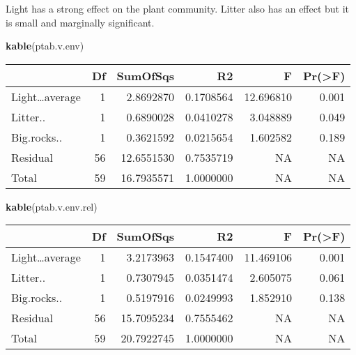 \documentclass[]{article}
\newenvironment{Shaded}{\begin{snugshade}}{\end{snugshade}}
\newcommand{\KeywordTok}[1]{\textcolor[rgb]{0.13,0.29,0.53}{\textbf{#1}}}
\newcommand{\NormalTok}[1]{#1}
\begin{document}
Light has a strong effect on the plant community. Litter also has an
effect but it is small and marginally significant.

\begin{Shaded}
\begin{Highlighting}[]
\KeywordTok{kable}\NormalTok{(ptab.v.env)}
\end{Highlighting}
\end{Shaded}

\begin{longtable}[]{@{}lrrrrr@{}}
\toprule
& Df & SumOfSqs & R2 & F & Pr(\textgreater{}F)\tabularnewline
\midrule
\endhead
Light\ldots{}average & 1 & 2.8692870 & 0.1708564 & 12.696810 &
0.001\tabularnewline
Litter.. & 1 & 0.6890028 & 0.0410278 & 3.048889 & 0.049\tabularnewline
Big.rocks.. & 1 & 0.3621592 & 0.0215654 & 1.602582 &
0.189\tabularnewline
Residual & 56 & 12.6551530 & 0.7535719 & NA & NA\tabularnewline
Total & 59 & 16.7935571 & 1.0000000 & NA & NA\tabularnewline
\bottomrule
\end{longtable}

\begin{Shaded}
\begin{Highlighting}[]
\KeywordTok{kable}\NormalTok{(ptab.v.env.rel)}
\end{Highlighting}
\end{Shaded}

\begin{longtable}[]{@{}lrrrrr@{}}
\toprule
& Df & SumOfSqs & R2 & F & Pr(\textgreater{}F)\tabularnewline
\midrule
\endhead
Light\ldots{}average & 1 & 3.2173963 & 0.1547400 & 11.469106 &
0.001\tabularnewline
Litter.. & 1 & 0.7307945 & 0.0351474 & 2.605075 & 0.061\tabularnewline
Big.rocks.. & 1 & 0.5197916 & 0.0249993 & 1.852910 &
0.138\tabularnewline
Residual & 56 & 15.7095234 & 0.7555462 & NA & NA\tabularnewline
Total & 59 & 20.7922745 & 1.0000000 & NA & NA\tabularnewline
\bottomrule
\end{longtable}
\end{document}
